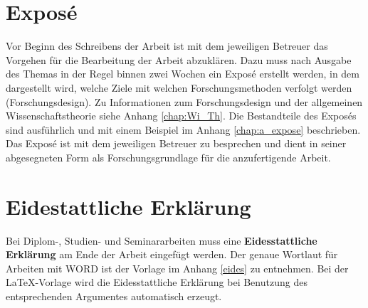 \section{Exposé}
\label{chap:expose}
Vor Beginn des Schreibens der Arbeit ist mit dem jeweiligen Betreuer das Vorgehen für die Bearbeitung der Arbeit abzuklären. Dazu muss nach Ausgabe des Themas in der Regel binnen zwei Wochen ein Exposé erstellt werden, in dem dargestellt wird, welche Ziele mit welchen Forschungsmethoden verfolgt werden (Forschungsdesign). Zu Informationen zum Forschungsdesign und der allgemeinen Wissenschaftstheorie siehe Anhang \ref{chap:Wi_Th}.
Die Bestandteile des Exposés sind ausführlich und mit einem Beispiel im Anhang \ref{chap:a_expose} beschrieben. Das Exposé ist mit dem jeweiligen Betreuer zu besprechen und dient in seiner abgesegneten Form als Forschungsgrundlage für die anzufertigende Arbeit.



\section{Eidestattliche Erklärung}
\label{chap:diplomarbeiten}

Bei Diplom-, Studien- und Seminararbeiten muss eine \textbf{Eidesstattliche
Erklärung} am Ende der Arbeit eingefügt werden. Der
genaue Wortlaut für Arbeiten mit WORD ist der Vorlage im Anhang \ref{eides} zu entnehmen. Bei der
\LaTeX-Vorlage wird die Eidesstattliche Erklärung bei Benutzung des entsprechenden Argumentes automatisch erzeugt. 